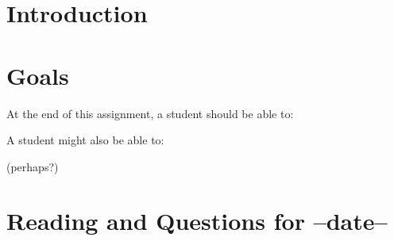 \documentclass[12pt,letterpaper]{article}
\theoremstyle{definition}
\begin{document}
\setlength{\parskip}{1ex plus 0.5ex minus 0.2ex}
\setlength{\parindent}{0pt}

\pagestyle{fancy}
\cfoot{}

\section*{Introduction}


\section*{Goals}
At the end of this assignment, a student should be able to:
\begin{compactitem}
\item
\item
\item
\end{compactitem}
A student might also be able to:
\begin{compactitem}
\item (perhaps?)
\end{compactitem}

\section*{Reading and Questions for --date--}





\end{document}
